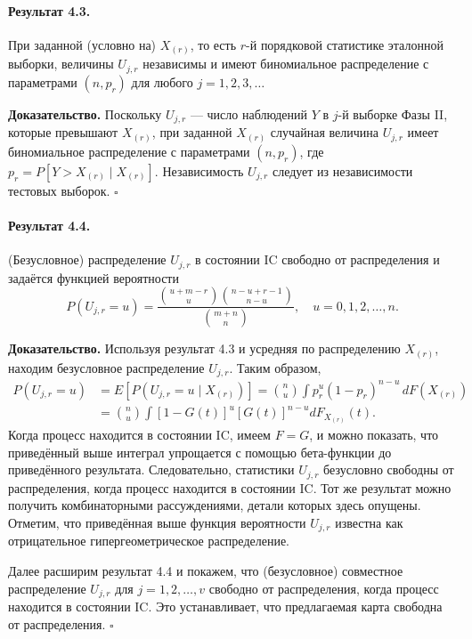 \paragraph{Результат 4.3.} При заданной (условно на) \(X_{(r)}\), то есть \(r\)-й порядковой статистике эталонной выборки, величины \(U_{j,r}\) независимы и имеют биномиальное распределение с параметрами \((n, p_r)\) для любого \(j = 1, 2, 3, \ldots\)

\noindent\textbf{Доказательство.} Поскольку \(U_{j,r}\) --- число наблюдений \(Y\) в \(j\)-й выборке Фазы II, которые превышают \(X_{(r)}\), при заданной \(X_{(r)}\) случайная величина \(U_{j,r}\) имеет биномиальное распределение с параметрами \((n, p_r)\), где \(p_r = P\left[ Y > X_{(r)} \mid X_{(r)} \right]\). Независимость \(U_{j,r}\) следует из независимости тестовых выборок. \(\square\)

\paragraph{Результат 4.4.} (Безусловное) распределение \(U_{j,r}\) в состоянии IC свободно от распределения и задаётся функцией вероятности
\[
	P(U_{j,r} = u) = \frac{\binom{u + m - r}{u}\binom{n - u + r - 1}{n - u}}{\binom{m + n}{n}}, \quad u = 0, 1, 2, \ldots, n.
\]

\noindent\textbf{Доказательство.} Используя результат 4.3 и усредняя по распределению \(X_{(r)}\), находим безусловное распределение \(U_{j,r}\). Таким образом,
\begin{align*}
	P(U_{j,r} = u) &= E\left[ P\left( U_{j,r} = u \mid X_{(r)} \right) \right] = \binom{n}{u}\int p_r^u(1 - p_r)^{n-u}\, dF\left( X_{(r)} \right) \\
	               &= \binom{n}{u}\int \left[ 1 - G(t) \right]^u\left[ G(t) \right]^{n-u} dF_{X_{(r)}}(t).
\end{align*}
Когда процесс находится в состоянии IC, имеем \(F = G\), и можно показать, что приведённый выше интеграл упрощается с помощью бета-функции до приведённого результата. Следовательно, статистики \(U_{j,r}\) безусловно свободны от распределения, когда процесс находится в состоянии IC. Тот же результат можно получить комбинаторными рассуждениями, детали которых здесь опущены. Отметим, что приведённая выше функция вероятности \(U_{j,r}\) известна как отрицательное гипергеометрическое распределение.

Далее расширим результат 4.4 и покажем, что (безусловное) совместное распределение \(U_{j,r}\) для \(j = 1, 2, \ldots, v\) свободно от распределения, когда процесс находится в состоянии IC. Это устанавливает, что предлагаемая карта свободна от распределения. \(\square\)

